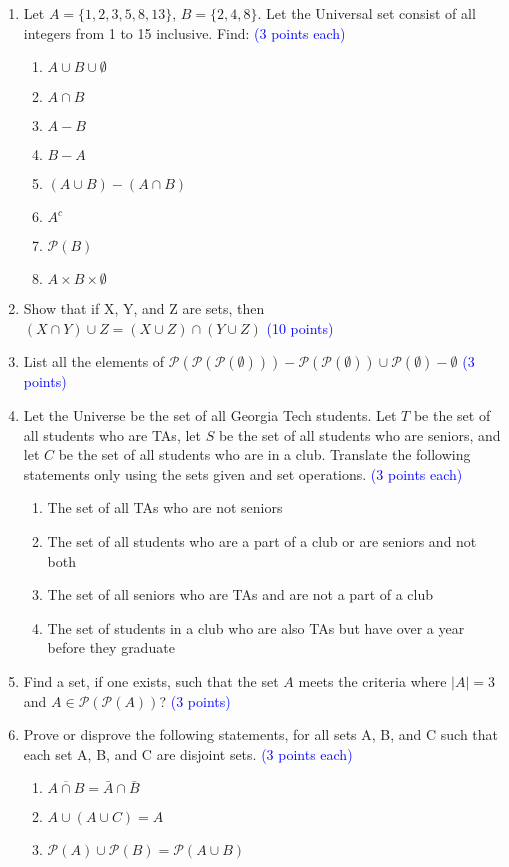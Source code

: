 \documentclass{article}
\newcommand{\pt}[1]{\textcolor{blue}{(#1 points)}}
\newcommand{\pte}[1]{\textcolor{blue}{(#1 points each)}}
\begin{document}
\begin{enumerate}
    \item Let $A = \{1, 2, 3, 5, 8, 13\}$,  $B = \{2, 4, 8\}$. Let the Universal set consist of all integers from 1 to 15 inclusive. Find: \pte{3}
        \begin{enumerate}
            \item $A \cup B \cup \emptyset$
            \item $A \cap B$ 
            \item $A - B$
            \item $B - A$ 
            \item $(A \cup B) - (A \cap B)$ 
            \item $A^c$
            \item $\mathcal{P}(B)$
            \item $A \times B \times \emptyset$
        \end{enumerate}
    
    \item Show that if X, Y, and Z are sets, then $(X \cap Y) \cup Z = (X \cup Z) \cap (Y \cup Z)$ \pt{10}
    
    \item List all the elements of $\mathcal{P}(\mathcal{P}(\mathcal{P}(\emptyset))) - \mathcal{P}(\mathcal{P}(\emptyset)) \cup \mathcal{P}(\emptyset) - \emptyset$ \pt{3}
    \item Let the Universe be the set of all Georgia Tech students. Let $T$ be the set of all students who are TAs, let $S$ be the set of all students who are seniors, and let $C$ be the set of all students who are in a club. Translate the following statements only using the sets given and set operations. \pte{3}
        \begin{enumerate}
            \item The set of all TAs who are not seniors
            \item The set of all students who are a part of a club or are seniors and not both
            \item The set of all seniors who are TAs and are not a part of a club
            \item The set of students in a club who are also TAs but have over a year before they graduate
        \end{enumerate}
    \item Find a set, if one exists, such that the set $A$ meets the criteria where $|A| = 3$ and $A \in \mathcal{P}(\mathcal{P}(A))$? \pt{3}
    
    \item Prove or disprove the following statements, for all sets A, B, and C such that each set A, B, and C are disjoint sets. \pte{3}
        \begin{enumerate}
            \item $\overline{A \cap B} = \bar{A} \cap \bar{B}$
            \item $A \cup (A \cup C) = A$
            \item $\mathcal{P}(A) \cup \mathcal{P}(B) = \mathcal{P}(A \cup B)$
        \end{enumerate}
        
    
    
\end{enumerate}
\end{document}
